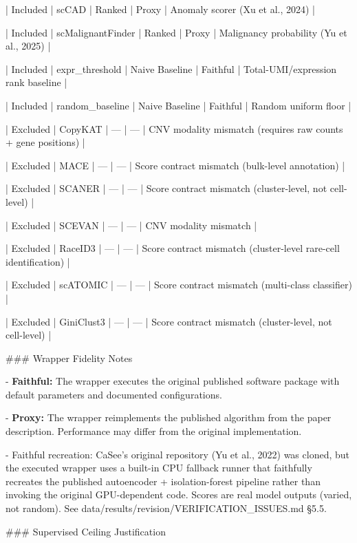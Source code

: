 \documentclass[11pt]{article}
\newcommand{\added}[1]{{\color{trackred}#1}}
\begin{document}
| Included | scCAD | Ranked | Proxy | Anomaly scorer (Xu et al., 2024) |

| Included | scMalignantFinder | Ranked | Proxy | Malignancy probability (Yu et al., 2025) |

| Included | expr\_threshold | Naive Baseline | Faithful | Total-UMI/expression rank baseline |

| Included | random\_baseline | Naive Baseline | Faithful | Random uniform floor |

| Excluded | CopyKAT | — | — | CNV modality mismatch (requires raw counts + gene positions) |

| Excluded | MACE | — | — | Score contract mismatch (bulk-level annotation) |

| Excluded | SCANER | — | — | Score contract mismatch (cluster-level, not cell-level) |

| Excluded | SCEVAN | — | — | CNV modality mismatch |

| Excluded | RaceID3 | — | — | Score contract mismatch (cluster-level rare-cell identification) |

| Excluded | scATOMIC | — | — | Score contract mismatch (multi-class classifier) |

| Excluded | GiniClust3 | — | — | Score contract mismatch (cluster-level, not cell-level) |

\#\#\# Wrapper Fidelity Notes

- \textbf{Faithful:} The wrapper executes the original published software package with default parameters and documented configurations.

- \textbf{Proxy:} The wrapper reimplements the published algorithm from the paper description. Performance may differ from the original implementation.

\added{- Faithful recreation: CaSee's original repository (Yu et al., 2022) was cloned, but the executed wrapper uses a built-in CPU fallback runner that faithfully recreates the published autoencoder + isolation-forest pipeline rather than invoking the original GPU-dependent code. Scores are real model outputs (varied, not random). See data/results/revision/VERIFICATION\_ISSUES.md §5.5.}

\#\#\# Supervised Ceiling Justification
\end{document}
